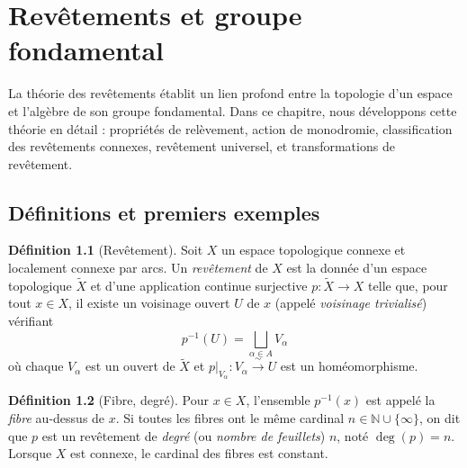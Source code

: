 \documentclass[12pt,a4paper,openany]{book}
\theoremstyle{definition}
\newtheorem{definition}{Définition}[chapter]
\theoremstyle{plain}
\theoremstyle{remark}
\newcommand{\N}{\mathbb{N}}
\begin{document}
\chapter{Revêtements et groupe fondamental}\label{ch:revetements}

\minitoc

\vspace{1em}

La théorie des revêtements établit un lien profond entre la topologie d'un espace
et l'algèbre de son groupe fondamental. Dans ce chapitre, nous développons cette théorie en
détail : propriétés de relèvement, action de monodromie, classification des revêtements
connexes, revêtement universel, et transformations de revêtement.

\section{Définitions et premiers exemples}\label{sec:rev-def}

\begin{definition}[Revêtement]\label{def:revetement}
Soit $X$ un espace topologique connexe et localement connexe par arcs.
Un \emph{revêtement} de $X$ est la donnée d'un espace topologique $\widetilde{X}$
et d'une application continue surjective $p \colon \widetilde{X} \to X$ telle que,
pour tout $x \in X$, il existe un voisinage ouvert $U$ de $x$ (appelé \emph{voisinage
trivialisé}) vérifiant
\[
p^{-1}(U) = \bigsqcup_{\alpha \in A} V_\alpha
\]
où chaque $V_\alpha$ est un ouvert de $\widetilde{X}$ et $p|_{V_\alpha} \colon V_\alpha \xrightarrow{\;\sim\;} U$
est un homéomorphisme.
\end{definition}

\begin{definition}[Fibre, degré]\label{def:fibre-degre}
Pour $x \in X$, l'ensemble $p^{-1}(x)$ est appelé la \emph{fibre} au-dessus de $x$.
Si toutes les fibres ont le même cardinal $n \in \N \cup \{\infty\}$, on dit que $p$ est un
revêtement de \emph{degré} (ou \emph{nombre de feuillets}) $n$, noté $\deg(p) = n$.
Lorsque $X$ est connexe, le cardinal des fibres est constant.
\end{definition}
\end{document}
